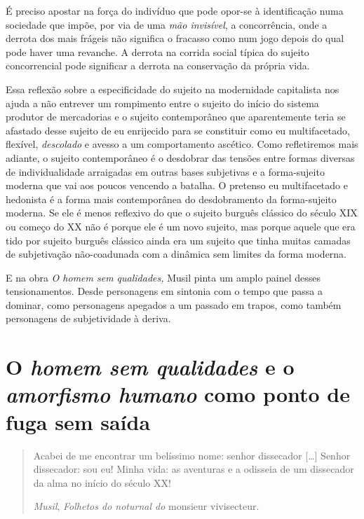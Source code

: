 É preciso apostar na força do indivíduo que pode opor-se à identificação
numa sociedade que impõe, por via de uma \emph{mão invisível}, a
concorrência, onde a derrota dos mais frágeis não significa o fracasso
como num jogo depois do qual pode haver uma revanche. A derrota na
corrida social típica do sujeito concorrencial pode significar a derrota
na conservação da própria vida.

Essa reflexão sobre a especificidade do sujeito na modernidade
capitalista nos ajuda a não entrever um rompimento entre o sujeito do
início do sistema produtor de mercadorias e o sujeito contemporâneo que
aparentemente teria se afastado desse sujeito de eu enrijecido para se
constituir como eu multifacetado, flexível, \emph{descolado} e avesso a
um comportamento ascético. Como refletiremos mais adiante, o sujeito
contemporâneo é o desdobrar das tensões entre formas diversas de
individualidade arraigadas em outras bases subjetivas e a forma-sujeito
moderna que vai aos poucos vencendo a batalha. O pretenso eu
multifacetado e hedonista é a forma mais contemporânea do desdobramento
da forma-sujeito moderna. Se ele é menos reflexivo do que o sujeito
burguês clássico do século XIX ou começo do XX não é porque ele é um
novo sujeito, mas porque aquele que era tido por sujeito burguês
clássico ainda era um sujeito que tinha muitas camadas de subjetivação
não-coadunada com a dinâmica sem limites da forma moderna.

E na obra \emph{O homem sem qualidades,} Musil pinta um amplo painel
desses tensionamentos. Desde personagens em sintonia com o tempo que
passa a dominar, como personagens apegados a um passado em trapos, como
também personagens de subjetividade à deriva.

\section{O \emph{homem sem qualidades} e o \emph{amorfismo humano} como ponto de fuga sem saída}

\begin{quote}
Acabei de me encontrar um belíssimo nome: senhor dissecador
{[}\ldots{}{]} Senhor dissecador: sou eu! Minha vida: as aventuras e a
odisseia de um dissecador da alma no início do século XX!

\emph{Musil}, \emph{Folhetos do noturnal do} monsieur vivisecteur.
\end{quote}

